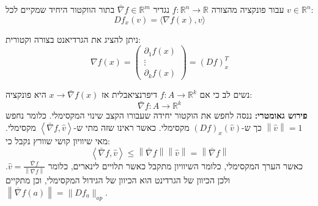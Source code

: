 \documentclass{tstextbook}
\begin{document}
\begin{definition}[גרדיאנט]
עבור פונקציה מהצורה \(f:\mathbb{R}^n\to\mathbb{R}\) נגדיר \(\bar{\nabla}f\in\mathbb{R}^m\) בתור הווקטור היחיד שמקיים לכל \(v\in \mathbb{R}^n\):
$$D f_{x}(v)=\langle\nabla f(x),v\rangle$$

\end{definition}
\begin{proposition}
ניתן להציג את הגרדיאנט בצורה וקטורית:
$$\nabla f\left(x\right)=\left(\begin{array}{c}{{\partial_{1}f\left(x\right)}}\\ {{\vdots}}\\ {{\partial_{k}f\left(x\right)}}\end{array}\right)=\left(D f\right)_{x}^{T}$$

\end{proposition}
נשים לב כי אם \(f:A\to \mathbb{R}^k\) דיפרנציאבלית אז \(x\to \bar{\nabla}f(x)\) היא פונקציה:
$$\bar{\nabla} f:A\to\mathbb{R}^k$$\textbf{פירוש גאומטרי:}
ננסה לחפש את הוקטור יחידה שעבורו הקצב שינוי המקסימלי. כלומר נחפש \(\left\lVert  \hat{v}  \right\rVert=1\) כך ש-\((Df)_{x}\left( \hat{v} \right)\) מקסימלי. כאשר ראינו שזה מתי ש-\(\left\langle  \bar{\nabla}f, \hat{v}  \right\rangle\) מקסימלי. מאי שיוויון קושי שוורץ נקבל כי:
$$\left\langle  \bar{\nabla} f, \hat{v}  \right\rangle \leq \left\lVert  \bar{\nabla} f  \right\rVert \left\lVert  \hat{v}  \right\rVert =\left\lVert  \bar{\nabla} f  \right\rVert $$
כאשר הערך המקסימלי, כלומר השיוויון מתקבל כאשר תלויים לינארים, כלומר \(\hat{v}=\frac{\bar{\nabla}f}{\left\lVert  \bar{\nabla}f  \right\rVert}\). ולכן הכיוון של הגרדינט הוא הכיוון של הגידול המקסימלי, וכן מתקיים \(\left\lVert  \bar{\nabla}f(a)  \right\rVert=\lVert Df_{a} \rVert_{op}\).
\end{document}
